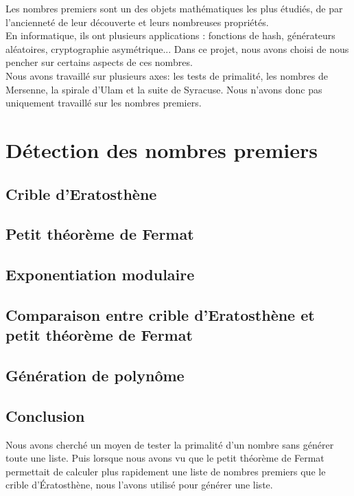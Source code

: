 \documentclass[a4paper,12pt]{article} %
\begin{document}
Les nombres premiers sont un des objets mathématiques les plus étudiés, de par l'ancienneté de leur découverte et leurs nombreuses propriétés.\\
En informatique, ils ont plusieurs applications : fonctions de hash, générateurs aléatoires, cryptographie asymétrique...
Dans ce projet, nous avons choisi de nous pencher sur certains aspects de ces nombres.\\

Nous avons travaillé sur plusieurs axes: les tests de primalité, les nombres de Mersenne, la spirale d'Ulam et la suite de Syracuse. Nous n'avons donc pas uniquement travaillé sur les nombres premiers.

\section{Détection des nombres premiers}
\subsection{Crible d'Eratosthène}


\subsection{Petit théorème de Fermat}


\subsection{Exponentiation modulaire}


\subsection{Comparaison entre crible d'Eratosthène et petit théorème de Fermat}


\subsection{Génération de polynôme}


\subsection{Conclusion}
Nous avons cherché un moyen de tester la primalité d'un nombre sans générer toute une liste. Puis lorsque nous avons vu que le petit théorème de Fermat permettait de calculer plus rapidement une liste de nombres premiers que le crible d’Ératosthène, nous l'avons utilisé pour générer une liste.\\
\end{document}
